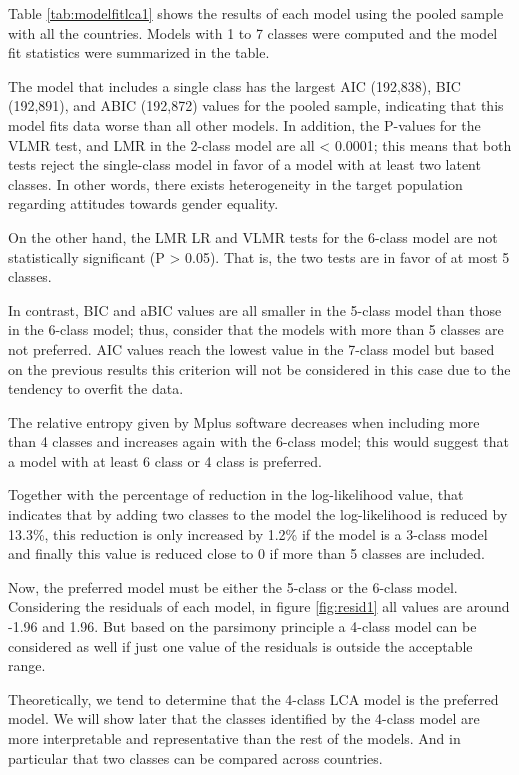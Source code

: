 \documentclass[12pt,a4paper,oneside]{reedthesis}
\begin{document}
Table \ref{tab:modelfitlca1} shows the results of each model using the pooled sample with all the countries. Models with 1 to 7 classes were computed and the model fit statistics were summarized in the table.

The model that includes a single class has the largest AIC (192,838), BIC (192,891), and ABIC (192,872) values for the pooled sample, indicating that this model fits data worse than all other models. In addition, the P-values for the VLMR test, and LMR in the 2-class model are all \textless{} 0.0001; this means that both tests reject the single-class model in favor of a model with at least two latent classes. In other words, there exists heterogeneity in the target population regarding attitudes towards gender equality.

On the other hand, the LMR LR and VLMR tests for the 6-class model are not statistically significant (P \textgreater{} 0.05). That is, the two tests are in favor of at most 5 classes.

In contrast, BIC and aBIC values are all smaller in the 5-class model than those in the 6-class model; thus, consider that the models with more than 5 classes are not preferred. AIC values reach the lowest value in the 7-class model but based on the previous results this criterion will not be considered in this case due to the tendency to overfit the data.

The relative entropy given by Mplus software decreases when including more than 4 classes and increases again with the 6-class model; this would suggest that a model with at least 6 class or 4 class is preferred.

Together with the percentage of reduction in the log-likelihood value, that indicates that by adding two classes to the model the log-likelihood is reduced by 13.3\%, this reduction is only increased by 1.2\% if the model is a 3-class model and finally this value is reduced close to 0 if more than 5 classes are included.

Now, the preferred model must be either the 5-class or the 6-class model. Considering the residuals of each model, in figure \ref{fig:resid1} all values are around -1.96 and 1.96. But based on the parsimony principle a 4-class model can be considered as well if just one value of the residuals is outside the acceptable range.

Theoretically, we tend to determine that the 4-class LCA model is the preferred model. We will show later that the classes identified by the 4-class model are more interpretable and representative than the rest of the models. And in particular that two classes can be compared across countries.
\end{document}
